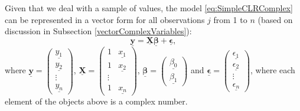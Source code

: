 \documentclass[
]{book}
\begin{document}
Given that we deal with a sample of values, the model \eqref{eq:SimpleCLRComplex} can be represented in a vector form for all observations \(j\) from 1 to \(n\) (based on discussion in Subsection \ref{vectorComplexVariables}):
\begin{equation}
    \underline{\mathbf{y}} = \underline{\mathbf{X}} \underline{\boldsymbol{\beta}} + \underline{\boldsymbol{\epsilon}} ,
    \label{eq:SimpleCLRVector}
\end{equation}
where \(\underline{\mathbf{y}}=\begin{pmatrix} \underline{{y}_1} \\ \underline{{y}_2} \\ \vdots \\ \underline{{y}_n} \end{pmatrix}\), \(\underline{\mathbf{X}} = \begin{pmatrix} 1 & \underline{{x}_1} \\ 1 & \underline{{x}_2}\\ \vdots \\ 1 & \underline{{x}_n} \end{pmatrix}\), \(\underline{\boldsymbol{\beta}} = \begin{pmatrix} \underline{{\beta}_0} \\ \underline{{\beta}_1} \end{pmatrix}\) and \(\underline{\boldsymbol{\epsilon}} = \begin{pmatrix} \underline{{\epsilon}_1} \\ \underline{{\epsilon}_2}\\ \vdots \\ \underline{{\epsilon}_n} \end{pmatrix}\), where each element of the objects above is a complex number.
\end{document}
